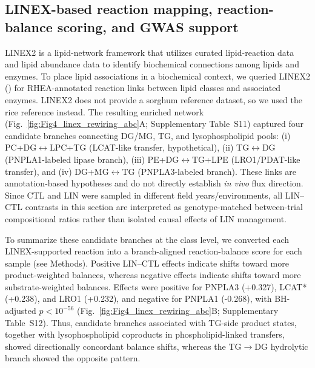 \documentclass[9pt,twocolumn,twoside]{rilabRxiv}
\begin{document}
\subsection*{LINEX-based reaction mapping, reaction-balance scoring, and GWAS support}

LINEX2 is a lipid-network framework that utilizes curated lipid-reaction data and lipid abundance data to identify biochemical connections among lipids and enzymes. To place lipid associations in a biochemical context, we queried LINEX2 (\cite{Morgat2016Rhea}) for RHEA-annotated reaction links between lipid classes and associated enzymes. LINEX2 does not provide a sorghum reference dataset, so we used the rice reference instead. The resulting enriched network (Fig.~\ref{fig:Fig4_linex_rewiring_abc}A; Supplementary Table~S11) captured four candidate branches connecting DG/MG, TG, and lysophospholipid pools: (i) PC+DG$\leftrightarrow$LPC+TG (LCAT-like transfer, hypothetical), (ii) TG$\leftrightarrow$DG (PNPLA1-labeled lipase branch), (iii) PE+DG$\leftrightarrow$TG+LPE (LRO1/PDAT-like transfer), and (iv) DG+MG$\leftrightarrow$TG (PNPLA3-labeled branch). These links are annotation-based hypotheses and do not directly establish \emph{in vivo} flux direction. Since CTL and LIN were sampled in different field years/environments, all LIN--CTL contrasts in this section are interpreted as genotype-matched between-trial compositional ratios rather than isolated causal effects of LIN management.

To summarize these candidate branches at the class level, we converted each LINEX-supported reaction into a branch-aligned reaction-balance score for each sample (see Methods). Positive LIN--CTL effects indicate shifts toward more product-weighted balances, whereas negative effects indicate shifts toward more substrate-weighted balances. Effects were positive for PNPLA3 (+0.327), LCAT* (+0.238), and LRO1 (+0.232), and negative for PNPLA1 (-0.268), with BH-adjusted \(p<10^{-56}\) (Fig.~\ref{fig:Fig4_linex_rewiring_abc}B; Supplementary Table~S12). Thus, candidate branches associated with TG-side product states, together with lysophospholipid coproducts in phospholipid-linked transfers, showed directionally concordant balance shifts, whereas the TG$\rightarrow$DG hydrolytic branch showed the opposite pattern.
\end{document}
